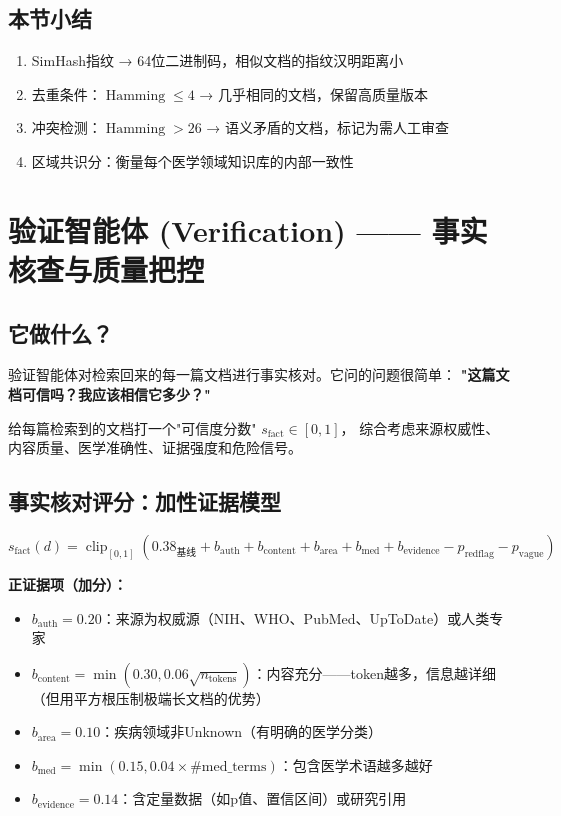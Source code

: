 \documentclass[11pt,a4paper]{ctexart}
\DeclareMathOperator{\clip}{clip}
\DeclareMathOperator{\Ham}{Hamming}
\begin{document}
\subsection{本节小结}

\begin{enumerate}[nosep]
\item SimHash指纹 → 64位二进制码，相似文档的指纹汉明距离小
\item 去重条件：$\Ham \leq 4$ → 几乎相同的文档，保留高质量版本
\item 冲突检测：$\Ham > 26$ → 语义矛盾的文档，标记为需人工审查
\item 区域共识分：衡量每个医学领域知识库的内部一致性
\end{enumerate}

\newpage

\section{验证智能体 (Verification) —— 事实核查与质量把控}

\subsection{它做什么？}

验证智能体对检索回来的每一篇文档进行事实核对。它问的问题很简单：
\textbf{"这篇文档可信吗？我应该相信它多少？"}

\begin{defbox}[验证智能体的任务]
给每篇检索到的文档打一个"可信度分数" $s_{\text{fact}} \in [0, 1]$，
综合考虑来源权威性、内容质量、医学准确性、证据强度和危险信号。
\end{defbox}

\subsection{事实核对评分：加性证据模型}

$$s_{\text{fact}}(d) = \clip_{[0,1]}\left(0.38_{\text{基线}} + b_{\text{auth}} + b_{\text{content}} + b_{\text{area}} + b_{\text{med}} + b_{\text{evidence}} - p_{\text{redflag}} - p_{\text{vague}}\right)$$

\textbf{正证据项（加分）：}
\begin{itemize}[nosep]
\item $b_{\text{auth}} = 0.20$：来源为权威源（NIH、WHO、PubMed、UpToDate）或人类专家
\item $b_{\text{content}} = \min(0.30, 0.06\sqrt{n_{\text{tokens}}})$：内容充分——token越多，信息越详细（但用平方根压制极端长文档的优势）
\item $b_{\text{area}} = 0.10$：疾病领域非Unknown（有明确的医学分类）
\item $b_{\text{med}} = \min(0.15, 0.04 \times \#\text{med\_terms})$：包含医学术语越多越好
\item $b_{\text{evidence}} = 0.14$：含定量数据（如p值、置信区间）或研究引用
\end{itemize}
\end{document}
